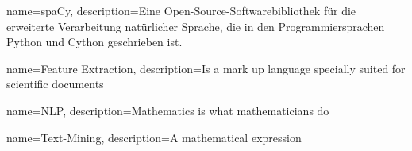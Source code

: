 

{
        name=spaCy,
        description={Eine Open-Source-Softwarebibliothek für die erweiterte Verarbeitung natürlicher Sprache, die in den Programmiersprachen Python und Cython geschrieben ist.}
}

{
        name=Feature Extraction,
        description={Is a mark up language specially suited for 
scientific documents}
}

{
        name=NLP,
        description={Mathematics is what mathematicians do}
}

{
        name=Text-Mining,
        description={A mathematical expression}
}